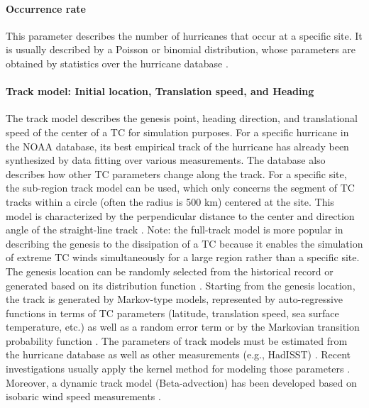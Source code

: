 \paragraph{Occurrence rate} This parameter describes the number of hurricanes that occur at a specific site. It is usually described by a Poisson or binomial distribution, whose parameters are obtained by statistics over the hurricane database \citep{li2016typhoon, vickery2009hurricane-c}.

\paragraph{Track model: Initial location, Translation speed, and Heading} The track model describes the genesis point, heading direction, and translational speed of the center of a TC for simulation purposes. For a specific hurricane in the NOAA database, its best empirical track of the hurricane has already been synthesized by data fitting over various measurements. The database also describes how other TC parameters change along the track. For a specific site, the sub-region track model can be used, which only concerns the segment of TC tracks within a circle (often the radius is 500 km) centered at the site. This model is characterized by the perpendicular distance to the center and direction angle of the straight-line track \citep{georgiou1986design, xiao2011typhoon}. Note: the full-track model is more popular in describing the genesis to the dissipation of a TC because it enables the simulation of extreme TC winds simultaneously for a large region rather than a specific site. The genesis location can be randomly selected from the historical record or generated based on its distribution function \citep{vickery2009hurricane-c}. Starting from the genesis location, the track is generated by Markov-type models, represented by auto-regressive functions in terms of TC parameters (latitude, translation speed, sea surface temperature, etc.) as well as a random error term \citep{vickery2000simulation} or by the Markovian transition probability function \citep{emanuel2006statistical}. The parameters of track models must be estimated from the hurricane database as well as other measurements (e.g., HadISST) \citep{li2016typhoon, liu2014projections, vickery2000simulation}. Recent investigations usually apply the kernel method for modeling those parameters \citep{chen2018statistical, mudd2015advancements}. Moreover, a dynamic track model (Beta-advection) has been developed based on isobaric wind speed measurements \citep{emanuel2006statistical}.


